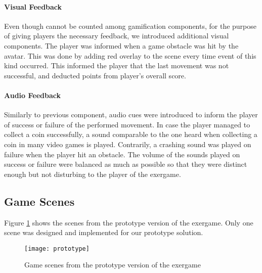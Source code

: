 \paragraph{Visual Feedback}
Even though cannot be counted among gamification components, for the purpose of giving players the necessary feedback, we introduced additional visual components. The player was informed when a game obstacle was hit by the avatar. This was done by adding red overlay to the scene every time event of this kind occurred. This informed the player that the last movement was not successful, and deducted points from player's overall score.
\paragraph{Audio Feedback}
Similarly to previous component, audio cues were introduced to inform the player of success or failure of the performed movement. In case the player managed to collect a coin successfully, a sound comparable to the one heard when collecting a coin in many video games is played. Contrarily, a crashing sound was played on failure when the player hit an obstacle. The volume of the sounds played on success or failure were balanced as much as possible so that they were distinct enough but not disturbing to the player of the exergame.
\subsection{Game Scenes}
Figure \ref{fig:prototype} shows the scenes from the prototype version of the exergame. Only one scene was designed and implemented for our prototype solution.\\
\begin{figure}[h]
    \centering
    \texttt{[image: prototype]}
    \caption{Game scenes from the prototype version of the exergame}
    \label{fig:prototype}
\end{figure}\\
\
